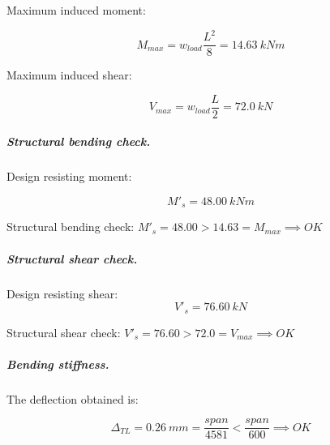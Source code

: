 \noindent Maximum induced moment:

\begin{equation}
  M_{max}= w_{load} \frac{L^2}{8}= 14.63\ kN m
\end{equation}

\noindent Maximum induced shear:

\begin{equation}
  V_{max}= w_{load} \frac{L}{2}= 72.0\ kN
\end{equation}

\subparagraph{Structural bending check.}

\noindent Design resisting moment:

\begin{equation}
  M'_s= 48.00\ kN m
\end{equation}

\noindent Structural bending check: $M'_s = 48.00 > 14.63 = M_{max} \implies OK$

\subparagraph{Structural shear check.}

\noindent Design resisting shear:
\begin{equation}
  V'_s= 76.60\ kN
\end{equation}

\noindent Structural shear check: $V'_s = 76.60 > 72.0 = V_{max} \implies OK$

\subparagraph{Bending stiffness.}
The deflection obtained is:

\begin{equation}
  \Delta_{TL}= 0.26\ mm= \frac{span}{4581} < \frac{span}{600} \implies OK
\end{equation}


